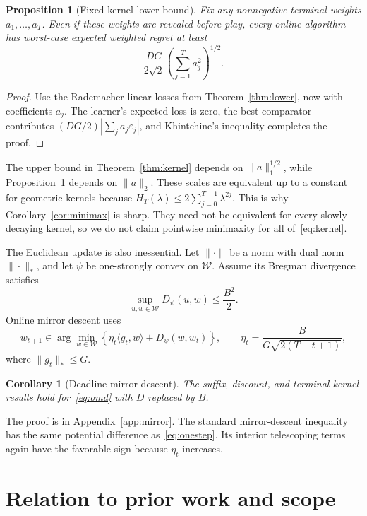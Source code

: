 \documentclass{article}
\newtheorem{corollary}[theorem]{Corollary}
\newtheorem{proposition}[theorem]{Proposition}
\newcommand{\W}{\mathcal W}
\begin{document}
\begin{proposition}[Fixed-kernel lower bound]
\label{prop:kernellower}
Fix any nonnegative terminal weights $a_1,\ldots,a_T$. Even if these weights are revealed before play, every online algorithm has worst-case expected weighted regret at least \[ \frac{DG}{2\sqrt2}\left(\sum_{j=1}^Ta_j^2\right)^{1/2}. \]
\end{proposition}

\begin{proof}
Use the Rademacher linear losses from Theorem~\ref{thm:lower}, now with coefficients $a_j$. The learner's expected loss is zero, the best comparator contributes $(DG/2)|\sum_ja_j\varepsilon_j|$, and Khintchine's inequality completes the proof.
\end{proof}

The upper bound in Theorem~\ref{thm:kernel} depends on $\|a\|_1^{1/2}$, while Proposition~\ref{prop:kernellower} depends on $\|a\|_2$. These scales are equivalent up to a constant for geometric kernels because $H_T(\lambda)\le2\sum_{j=0}^{T-1}\lambda^{2j}$. This is why Corollary~\ref{cor:minimax} is sharp. They need not be equivalent for every slowly decaying kernel, so we do not claim pointwise minimaxity for all of~\eqref{eq:kernel}.

The Euclidean update is also inessential. Let $\|\cdot\|$ be a norm with dual norm $\|\cdot\|_*$, and let $\psi$ be one-strongly convex on $\W$. Assume its Bregman divergence satisfies \[ \sup_{u,w\in\W}D_\psi(u,w)\le\frac{B^2}{2}. \] Online mirror descent uses
\begin{equation}
w_{t+1}\in\arg\min_{w\in\W}\left\{\eta_t\langle g_t,w\rangle+D_\psi(w,w_t)\right\},
\qquad
\eta_t=\frac{B}{G\sqrt{2(T-t+1)}},
\label{eq:omd}
\end{equation}
where $\|g_t\|_*\le G$.

\begin{corollary}[Deadline mirror descent]
\label{cor:mirror}
The suffix, discount, and terminal-kernel results hold for~\eqref{eq:omd} with $D$ replaced by $B$.
\end{corollary}

The proof is in Appendix~\ref{app:mirror}. The standard mirror-descent inequality has the same potential difference as~\eqref{eq:onestep}. Its interior telescoping terms again have the favorable sign because $\eta_t$ increases.

\section{Relation to prior work and scope}
\label{sec:related}
\end{document}
